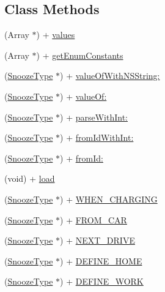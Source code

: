 \subsection*{Class Methods}
\begin{DoxyCompactItemize}
\item 
(Array $\ast$) + \hyperlink{interface_snooze_type_aaf32cca96bfcc84cd29344c6fa316ac5}{values}
\item 
(Array $\ast$) + \hyperlink{interface_snooze_type_a47a7d2fd899ddf022daa13e168371e8b}{get\+Enum\+Constants}
\item 
(\hyperlink{interface_snooze_type}{Snooze\+Type} $\ast$) + \hyperlink{interface_snooze_type_ac281c2c6acc3501a418ace099d5720e5}{value\+Of\+With\+N\+S\+String\+:}
\item 
(\hyperlink{interface_snooze_type}{Snooze\+Type} $\ast$) + \hyperlink{interface_snooze_type_affd13e2045220782808fe8fb421ca317}{value\+Of\+:}
\item 
(\hyperlink{interface_snooze_type}{Snooze\+Type} $\ast$) + \hyperlink{interface_snooze_type_a29e71e46183158b2f120f248ad2f178a}{parse\+With\+Int\+:}
\item 
(\hyperlink{interface_snooze_type}{Snooze\+Type} $\ast$) + \hyperlink{interface_snooze_type_adf3ae5f9c38509c13a63d2dd7e8042d8}{from\+Id\+With\+Int\+:}
\item 
(\hyperlink{interface_snooze_type}{Snooze\+Type} $\ast$) + \hyperlink{interface_snooze_type_ae8f6298f28cee9ee8c8c7191e2c71775}{from\+Id\+:}
\item 
(void) + \hyperlink{interface_snooze_type_a07b27a3f389329a130564e347a55cb80}{load}
\item 
(\hyperlink{interface_snooze_type}{Snooze\+Type} $\ast$) + \hyperlink{interface_snooze_type_af6c47417164dad3f684d1b3c2a6790d5}{W\+H\+E\+N\+\_\+\+C\+H\+A\+R\+G\+I\+N\+G}
\item 
(\hyperlink{interface_snooze_type}{Snooze\+Type} $\ast$) + \hyperlink{interface_snooze_type_aeaa9dee39ff5b0c867f6baf0effb4122}{F\+R\+O\+M\+\_\+\+C\+A\+R}
\item 
(\hyperlink{interface_snooze_type}{Snooze\+Type} $\ast$) + \hyperlink{interface_snooze_type_a3aa68e3314b4246f6d5cb41aad7f1648}{N\+E\+X\+T\+\_\+\+D\+R\+I\+V\+E}
\item 
(\hyperlink{interface_snooze_type}{Snooze\+Type} $\ast$) + \hyperlink{interface_snooze_type_ac5cb23173a73bee86e44943688880125}{D\+E\+F\+I\+N\+E\+\_\+\+H\+O\+M\+E}
\item 
(\hyperlink{interface_snooze_type}{Snooze\+Type} $\ast$) + \hyperlink{interface_snooze_type_a6f36013345914ceca5332b99dd411849}{D\+E\+F\+I\+N\+E\+\_\+\+W\+O\+R\+K}

\end{DoxyCompactItemize}
